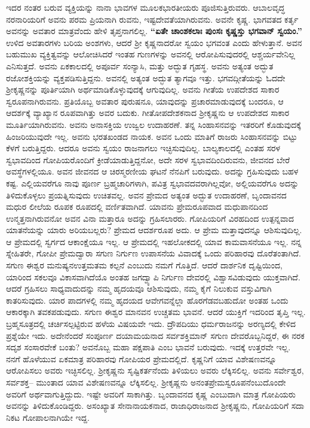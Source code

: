 ಇದರ ನಂತರ ಬರುವ ವ್ಯಕ್ತಿಯನ್ನು ನಾನಾ ಭಾವಗಳ ಮೂಲಕ\break ಭಾರತೀಯರು ಪೂಜಿಸುತ್ತಿರುವರು. ಆಬಾಲವೃದ್ಧ ನರನಾರಿಯರಿಗೆ ಅವನು ಪರಮ ಪ್ರಿಯನಾಗಿ ರುವನು, ಇಷ್ಟದೇವತೆಯಾಗಿರುವನು. ಅವನೇ ಕೃಷ್ಣ. ಭಾಗವತದ ಕರ್ತೃ ಅವನನ್ನು ಅವತಾರ ಮಾತ್ರವೆಂದು ಹೇಳಿ ತೃಪ್ತನಾಗಲಿಲ್ಲ. \textbf{“ಏತೇ ಚಾಂಶಕಲಾಃ ಪುಂಸಃ ಕೃಷ್ಣಸ್ತು ಭಗವಾನ್​ ಸ್ವಯಂ.”} ಉಳಿದ ಅವತಾರಗಳು ಬರಿಯ ಅಂಶಗಳು, ಆದರೆ ಶ‍್ರೀ ಕೃಷ್ಣನಾದರೋ ಸ್ವಯಂ ಭಗವಂತ ಎಂದು ಹೇಳುತ್ತಾನೆ. ಅವನ ಬಹುಮುಖ ವ್ಯಕ್ತಿತ್ವವನ್ನು ಆಲೋಚಿಸಿದರೆ ಇಂತಹ ಗುಣಗಳನ್ನು ಅವನಲ್ಲಿ ಆರೋಪಿಸುವುದರಲ್ಲಿ ಆಶ್ಚರ್ಯ\-ವೇನಿಲ್ಲ ಎನಿಸುತ್ತದೆ. ಅವನು ಏಕಕಾಲದಲ್ಲಿ ಅಪೂರ್ವ ಸಂನ್ಯಾಸಿ, ಮತ್ತು ಅದ್ಭುತ ಗೃಹಸ್ಥ. ಅವನು ಅತ್ಯಂತ ಅದ್ಭುತ ರಜೋಶಕ್ತಿಯನ್ನು ವ್ಯಕ್ತಪಡಿಸುತ್ತಿದ್ದನು. ಅವನಲ್ಲಿ ಅತ್ಯಂತ ಅದ್ಭುತ ತ್ಯಾಗವೂ ಇತ್ತು. ಭಗವದ್ಗೀತೆಯನ್ನು ಓದದೇ ಶ‍್ರೀಕೃಷ್ಣನನ್ನು ಪೂರ್ತಿಯಾಗಿ ಅರ್ಥಮಾಡಿಕೊಳ್ಳುವುದಕ್ಕೆ ಆಗುವುದಿಲ್ಲ. ಅವನು ಗೀತೆಯ ಉಪದೇಶದ ಸಾಕಾರ ಸ್ವರೂಪನಾಗಿರುವನು. ಪ್ರತಿಯೊಬ್ಬ ಅವತಾರ ಪುರುಷನೂ, ಯಾವು\-ದನ್ನು ಪ್ರಚಾರಮಾಡುವುದಕ್ಕೆ ಬಂದರೂ, ಆ ಆದರ್ಶಕ್ಕೆ ವ್ಯಾಖ್ಯಾನ ರೂಪವಾಗಿತ್ತು ಅವರ ಬದುಕು. ಗೀತೋಪದೇಶಕನಾದ ಶ‍್ರೀಕೃಷ್ಣನು ಆ ಉಪದೇಶದ ಸಾಕಾರ ಮೂರ್ತಿಯಾಗಿರುವನು. ಅವನು ಅನಾಸಕ್ತಿಯ ಉಜ್ವಲ ಉದಾ\-ಹರಣೆ. ತನ್ನ ಸಿಂಹಾಸನವನ್ನು ಇತರರಿಗೆ ಕೊಡುವುದಕ್ಕೆ ಹಿಂಜರಿಯುವುದೇ ಇಲ್ಲ. ಅವನು ಭರತಖಂಡದ ನಾಯಕ. ಅವನ ಒಂದು ಮಾತಿಗೆ ರಾಜರು ಸಿಂಹಾಸನವನ್ನು ಬಿಟ್ಟು ಕೆಳಗೆ ಬರುತ್ತಿದ್ದರು. ಆದರೂ ಅವನು ಸ್ವಯಂ ರಾಜ\-ನಾಗಲು ಇಚ್ಛಿಸುವುದಿಲ್ಲ. ಬಾಲ್ಯಕಾಲದಲ್ಲಿ ಎಂತಹ ಸರಳ ಸ್ವಭಾವದಿಂದ ಗೋಪಿಯರೊಂದಿಗೆ ಕ್ರೀಡೆಯಾಡುತ್ತಿದ್ದನೋ, ಅದೇ ಸರಳ ಸ್ವಭಾವದಿಂದಿರುವನು, ಜೀವನದ ಬೇರೆ ಅವಸ್ಥೆಗಳಲ್ಲಿಯೂ. ಅವನ ಜೀವನದ ಆ ಚಿರಸ್ಮರಣೀಯ ಘಟನೆ ನೆನಪಿಗೆ ಬರುವುದು. ಅದನ್ನು ಗ್ರಹಿಸುವುದು ಬಹಳ ಕಷ್ಟ. ಎಲ್ಲಿಯವರೆಗೂ ನಾವು ಪೂರ್ಣ ಬ್ರಹ್ಮಚಾರಿಗಳಾಗಿ, ಪವಿತ್ರ ಸ್ವಭಾವದವರಾಗಿಲ್ಲವೋ, ಅಲ್ಲಿಯವರೆಗೂ ಅದನ್ನು ತಿಳಿದುಕೊಳ್ಳಲು ಪ್ರಯತ್ನಿಸುವುದು ಉಚಿತವಲ್ಲ. ಅವನ ಪ್ರೇಮದ ಅತ್ಯಂತ ಅದ್ಭುತ ಉದಾಹರಣೆ, ಬೃಂದಾವನದ ಮಧುರ ಲೀಲೆಯ ರೂಪಕ ರೂಪದಲ್ಲಿ ವರ್ಣಿತವಾಗಿದೆ. ಯಾವನು ಪ್ರೇಮರೂಪವಾದ ಮಧುಪಾನದಿಂದ ಉನ್ಮತ್ತನಾಗಿರುವನೋ ಅವನ ವಿನಾ ಮತ್ತಾರೂ ಅದನ್ನು ಗ್ರಹಿಸಲಾರರು. ಗೋಪಿಯರಿಗೆ ವಿರಹದಿಂದ ಉತ್ಪನ್ನವಾದ ಯಾತನೆಯನ್ನು ಯಾರು ಅರಿಯಬಲ್ಲರು? ಪ್ರೇಮದ ಆದರ್ಶರೂಪ ಅದು. ಆ ಪ್ರೇಮ ಮತ್ತಾವುದನ್ನೂ ಆಶಿಸುವುದಿಲ್ಲ. ಆ ಪ್ರೇಮದಲ್ಲಿ ಸ್ವರ್ಗದ ಆಕಾಂಕ್ಷೆಯೂ ಇಲ್ಲ. ಆ ಪ್ರೇಮದಲ್ಲಿ ಇಹಲೋಕದಲ್ಲಿ ಯಾವ ಕಾಮವಾಸನೆಯೂ ಇಲ್ಲ. ನನ್ನ ಸ್ನೇಹಿತರೇ, ಗೋಪೀ ಪ್ರೇಮದ್ವಾರಾ ಸಗುಣ ನಿರ್ಗುಣ ಉಪಾಸನೆಯ ವಿವಾದಕ್ಕೆ ಒಂದು ಪರಿಹಾರವು ದೊರೆತಂತಾಗಿದೆ. ಸಗುಣ ಈಶ್ವರ ಮನುಷ್ಯನ\break ಉತ್ತಮತಮ ಕಲ್ಪನೆ ಎಂಬುದು ನಮಗೆ ಗೊತ್ತಿದೆ. ಆದರೆ ದಾರ್ಶನಿಕ ದೃಷ್ಟಿಯಿಂದ, ಯಾರಿಂದ ಸಕಲವೂ ವಿಕಾಸವಾಗಿದೆಯೊ ಅಂತಹ ಜಗದ್ವ್ಯಾಪಿ ನಿರ್ಗುಣ ದೇವರಲ್ಲಿ ವಿಶ್ವಾಸವಿಡುವುದು ಯುಕ್ತವಾಗಿದೆ. ಆದರೆ ಗ್ರಹಿಸಲು ಸಾಧ್ಯವಾದುದನ್ನು ನಮ್ಮ ಹೃದಯವೂ ಆಶಿಸುವುದು, ನಮ್ಮ ಕೈಗೆ ನಿಲುಕುವ ವಸ್ತುವಿಗಾಗಿ ಕಾತರಿಸುವುದು. ಯಾರ ಪಾದಗಳಲ್ಲಿ ನಮ್ಮ ಹೃದಯದ ಆವೇಗವನ್ನೆಲ್ಲಾ ಹೊರಗೆಡವಬಹುದೋ ಅಂತಹ ಒಂದು ಆಕಾರಕ್ಕಾಗಿ ತವಕಪಡುವುದು. ಸಗುಣ ಈಶ್ವರ ಮಾನವನ ಉಚ್ಚತಮ ಭಾವನೆ. ಆದರೆ ಯುಕ್ತಿಗೆ ಇದರಿಂದ ತೃಪ್ತಿ ಇಲ್ಲ. ಬ್ರಹ್ಮಸೂತ್ರದಲ್ಲಿ ಚರ್ಚಿಸಲ್ಪಟ್ಟಿರುವ ಹಳೆಯ ವಿಷಯವೇ ಇದು. ದ್ರೌಪದಿಯು ಧರ್ಮರಾಜನನ್ನು ಅರಣ್ಯದಲ್ಲಿ ಕೇಳಿದ ಪ್ರಶ್ನೆಯೇ ಇದು. ಅದೇನೆಂದರೆ ಸಂಪೂರ್ಣ ದಯಾಮಯನಾದ ಸರ್ವಶಕ್ತಿಮಾನ್​ ಸಗುಣ ದೇವರೊಬ್ಬನಿದ್ದರೆ, ಈ ನರಕ ಸದೃಶ ಸಂಸಾರವೇಕೆ ಬಂತು? ಅವನೊಬ್ಬ ಮಹಾ ಪಕ್ಷಪಾತಿ ಎಂಬ ಭಾವನೆ ಬರುವುದು. ಇದಕ್ಕೆ ಉತ್ತರವೇ ಇಲ್ಲ. ನನಗೆ ಹೊಳೆಯುವ ಏಕಮಾತ್ರ ಪರಿಹಾರವು ಗೋಪಿಯರ ಪ್ರೇಮದಲ್ಲಿದೆ. ಕೃಷ್ಣನಿಗೆ ಯಾವ ವಿಶೇಷಣವನ್ನೂ ಆರೋಪಿಸಲು ಅವರು ಇಚ್ಛಿಸಲಿಲ್ಲ. ಶ‍್ರೀಕೃಷ್ಣನು ಸೃಷ್ಟಿಕರ್ತನೆಂದು ತಿಳಿಯಲು ಅವರು ಲೆಕ್ಕಿಸಲಿಲ್ಲ. ಅವನು ಸರ್ವೇಶ್ವರ, ಸರ್ವಶಕ್ತ– ಮುಂತಾದ ಯಾವ ವಿಶೇಷಣವನ್ನೂ ಲೆಕ್ಕಿಸಲಿಲ್ಲ. ಶ‍್ರೀಕೃಷ್ಣನು ಅನಂತಪ್ರೇಮಸ್ವರೂಪನೆಂಬುದೊಂದೇ ಅವರಿಗೆ ಅರ್ಥವಾಗುತ್ತಿದ್ದುದು. ಇಷ್ಟೇ ಅವರಿಗೆ ಸಾಕಾಗಿತ್ತು. ಬೃಂದಾವನದ ಕೃಷ್ಣ ಎಂಬುದಾಗಿ ಮಾತ್ರ ಗೋಪಿಯರು ಅವನನ್ನು ತಿಳಿದುಕೊಂಡಿದ್ದರು. ಅಸಂಖ್ಯಾತ ಸೇನಾನಾಯಕನಾದ, ರಾಜಾಧಿರಾಜನಾದ ಶ‍್ರೀಕೃಷ್ಣನು, ಗೋಪಿಯರಿಗೆ ಸದಾ ನಿಕಟ ಗೋಪಾಲನಾಗಿಯೇ ಇದ್ದ.

